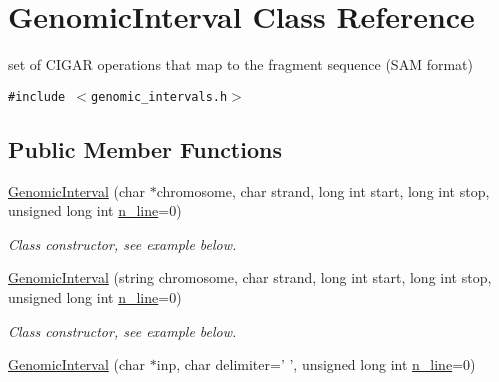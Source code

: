 \hypertarget{classGenomicInterval}{
\section{GenomicInterval Class Reference}
\label{classGenomicInterval}
}
set of CIGAR operations that map to the fragment sequence (SAM format)  


{\tt \#include $<$genomic\_\-intervals.h$>$}

\subsection*{Public Member Functions}
\begin{CompactItemize}
\item 
\hypertarget{classGenomicInterval_09dcaee742ca117a8caaa1c656d0e354}{
\hyperlink{classGenomicInterval_09dcaee742ca117a8caaa1c656d0e354}{GenomicInterval} (char $\ast$chromosome, char strand, long int start, long int stop, unsigned long int \hyperlink{classGenomicInterval_0dbe6195570468c386eea923e30c762c}{n\_\-line}=0)}
\label{classGenomicInterval_09dcaee742ca117a8caaa1c656d0e354}

\begin{CompactList}\small\item\em Class constructor, see example below. \item\end{CompactList}\item 
\hypertarget{classGenomicInterval_c452f2239b17bc72efe4eef12a261514}{
\hyperlink{classGenomicInterval_c452f2239b17bc72efe4eef12a261514}{GenomicInterval} (string chromosome, char strand, long int start, long int stop, unsigned long int \hyperlink{classGenomicInterval_0dbe6195570468c386eea923e30c762c}{n\_\-line}=0)}
\label{classGenomicInterval_c452f2239b17bc72efe4eef12a261514}

\begin{CompactList}\small\item\em Class constructor, see example below. \item\end{CompactList}\item 
\hypertarget{classGenomicInterval_99f413828468dca1eeb5cc806848d98e}{
\hyperlink{classGenomicInterval_99f413828468dca1eeb5cc806848d98e}{GenomicInterval} (char $\ast$inp, char delimiter=' ', unsigned long int \hyperlink{classGenomicInterval_0dbe6195570468c386eea923e30c762c}{n\_\-line}=0)}
\label{classGenomicInterval_99f413828468dca1eeb5cc806848d98e}


\end{CompactItemize}
